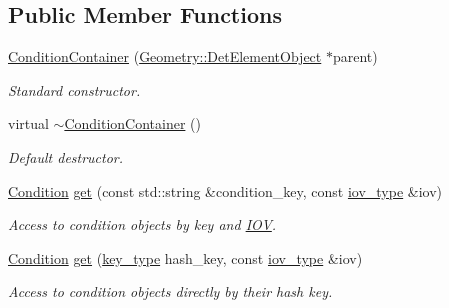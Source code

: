 \subsection*{Public Member Functions}
\begin{DoxyCompactItemize}
\item 
\hyperlink{class_d_d4hep_1_1_conditions_1_1_interna_1_1_condition_container_a766c849d73bfff4a401fc002a75c7594}{ConditionContainer} (\hyperlink{class_d_d4hep_1_1_geometry_1_1_det_element_object}{Geometry::DetElementObject} $\ast$parent)
\begin{DoxyCompactList}\small\item\em Standard constructor. \item\end{DoxyCompactList}\item 
virtual \hyperlink{class_d_d4hep_1_1_conditions_1_1_interna_1_1_condition_container_a18cfd1f77eea4ae5fdf3a46ed8aa61ea}{$\sim$ConditionContainer} ()
\begin{DoxyCompactList}\small\item\em Default destructor. \item\end{DoxyCompactList}\item 
\hyperlink{class_d_d4hep_1_1_conditions_1_1_condition}{Condition} \hyperlink{class_d_d4hep_1_1_conditions_1_1_interna_1_1_condition_container_a27dc131c286e1e4be01223d446842e4f}{get} (const std::string \&condition\_\-key, const \hyperlink{class_d_d4hep_1_1_i_o_v}{iov\_\-type} \&iov)
\begin{DoxyCompactList}\small\item\em Access to condition objects by key and \hyperlink{class_d_d4hep_1_1_i_o_v}{IOV}. \item\end{DoxyCompactList}\item 
\hyperlink{class_d_d4hep_1_1_conditions_1_1_condition}{Condition} \hyperlink{class_d_d4hep_1_1_conditions_1_1_interna_1_1_condition_container_a49d51d2eee6ff6d8d5f959338a719725}{get} (\hyperlink{class_d_d4hep_1_1_conditions_1_1_interna_1_1_condition_container_a7a4545b4b0536565feb7346bd97c63fa}{key\_\-type} hash\_\-key, const \hyperlink{class_d_d4hep_1_1_i_o_v}{iov\_\-type} \&iov)
\begin{DoxyCompactList}\small\item\em Access to condition objects directly by their hash key. \item\end{DoxyCompactList}\item 

\end{DoxyCompactItemize}
